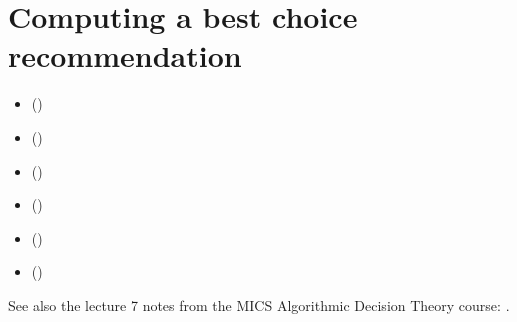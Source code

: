 \documentclass[a4paper,10pt,english]{sphinxhowto}
\begin{document}
\section{Computing a best choice recommendation}
\label{\detokenize{tutorial:computing-a-best-choice-recommendation}}\label{\detokenize{tutorial:rubis-tutorial-label}}
\begin{sphinxShadowBox}
\begin{itemize}
\item {} 
\label{\detokenize{tutorial:id210}}{\hyperref[\detokenize{tutorial:what-site-to-choose}]{}} ()

\item {} 
\label{\detokenize{tutorial:id211}}{\hyperref[\detokenize{tutorial:performance-tableau}]{}} ()

\item {} 
\label{\detokenize{tutorial:id212}}{\hyperref[\detokenize{tutorial:id35}]{}} ()

\item {} 
\label{\detokenize{tutorial:id213}}{\hyperref[\detokenize{tutorial:rubis-best-choice-recommendations}]{}} ()

\item {} 
\label{\detokenize{tutorial:id214}}{\hyperref[\detokenize{tutorial:computing-strict-best-choice-recommendations}]{}} ()

\item {} 
\label{\detokenize{tutorial:id215}}{\hyperref[\detokenize{tutorial:weakly-ordering-the-outranking-digraph}]{}} ()

\end{itemize}
\end{sphinxShadowBox}

See also the lecture 7 notes from the MICS Algorithmic Decision Theory course: .
\end{document}
